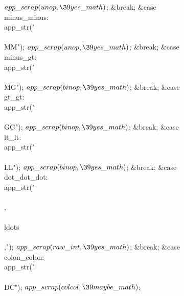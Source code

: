 ${}\\{app\_scrap}(\\{unop},\39\\{yes\_math}){}$;\5
\&{break};\6
\4\&{case} \\{minus\_minus}:\5
\\{app\_str}(\.{"\\\\MM"});\5
${}\\{app\_scrap}(\\{unop},\39\\{yes\_math}){}$;\5
\&{break};\6
\4\&{case} \\{minus\_gt}:\5
\\{app\_str}(\.{"\\\\MG"});\5
${}\\{app\_scrap}(\\{binop},\39\\{yes\_math}){}$;\5
\&{break};\6
\4\&{case} \\{gt\_gt}:\5
\\{app\_str}(\.{"\\\\GG"});\5
${}\\{app\_scrap}(\\{binop},\39\\{yes\_math}){}$;\5
\&{break};\6
\4\&{case} \\{lt\_lt}:\5
\\{app\_str}(\.{"\\\\LL"});\5
${}\\{app\_scrap}(\\{binop},\39\\{yes\_math}){}$;\5
\&{break};\6
\4\&{case} \\{dot\_dot\_dot}:\5
\\{app\_str}(\.{"\\\\,\\\\ldots\\\\,"});\5
${}\\{app\_scrap}(\\{raw\_int},\39\\{yes\_math}){}$;\5
\&{break};\6
\4\&{case} \\{colon\_colon}:\5
\\{app\_str}(\.{"\\\\DC"});\5
${}\\{app\_scrap}(\\{colcol},\39\\{maybe\_math}){}$;\5
